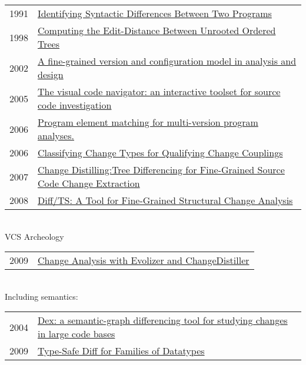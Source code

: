 \documentclass[12pt]{article}
\begin{document}
\begin{tabular}{ | l | l | }
	1991 & \href{http://citeseerx.ist.psu.edu/viewdoc/summary?doi=10.1.1.13.9377}{Identifying Syntactic Differences Between Two Programs} \\
	
	1998 & \href{http://128.148.32.110/research/pubs/pdfs/1998/Klein-1998-CED.pdf}{Computing the Edit-Distance Between Unrooted Ordered Trees} \\
	2002 & \href{http://ieeexplore.ieee.org/xpls/abs_all.jsp?arnumber=1167813}{A fine-grained version and configuration model in analysis and design } \\
	2005 & \href{http://ieeexplore.ieee.org/xpl/articleDetails.jsp?tp=&arnumber=1532125}{The visual code navigator: an interactive toolset for source code investigation	} \\
	2006 & \href{http://dl.acm.org/citation.cfm?id=1137999}{Program element matching for multi-version program analyses. } \\
	2006 & \href{http://ieeexplore.ieee.org/xpls/abs_all.jsp?arnumber=1631103&tag=1}{Classifying Change Types for Qualifying Change Couplings } \\
	2007 & \href{http://ieeexplore.ieee.org/xpl/articleDetails.jsp?tp=&arnumber=4339230}{Change Distilling:Tree Differencing for Fine-Grained Source Code Change Extraction } \\
	2008 & \href{http://ieeexplore.ieee.org/xpl/articleDetails.jsp?tp=&arnumber=4656419}{Diff/TS: A Tool for Fine-Grained Structural Change Analysis } \\
\end{tabular}
\\
VCS Archeology\\
\begin{tabular}{ | l | l | }
	2009 & \href{http://ieeexplore.ieee.org/xpl/articleDetails.jsp?tp=&arnumber=4721180}{Change Analysis with Evolizer and ChangeDistiller } \\
\end{tabular}
\\
Including semantics: \\
\begin{tabular}{ | l | l | }
	2004 & \href{http://ieeexplore.ieee.org/xpls/abs_all.jsp?arnumber=1357803&tag=1}{Dex: a semantic-graph differencing tool for studying changes in large code bases } \\
	2009 & \href{http://www.andres-loeh.de/gdiff-wgp.pdf}{Type-Safe Diff for Families of Datatypes } \\
\end{tabular}
\end{document}
